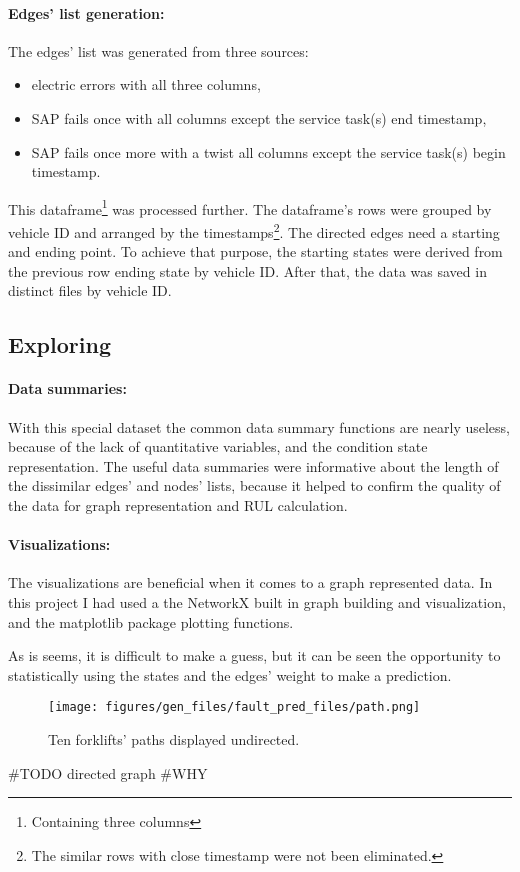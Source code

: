 \paragraph{Edges' list generation:}
The edges' list was generated from three sources: 
\begin{itemize}
	\item{electric errors} with all three columns,
	\item{SAP fails once} with all columns except the service task(s) end timestamp,
	\item{SAP fails once more with a twist} all columns except the service task(s) begin timestamp.
\end{itemize}

This dataframe\footnote{Containing three columns} was processed further. The dataframe's rows were grouped by vehicle ID and arranged by the timestamps\footnote{The similar rows with close timestamp were not been eliminated.}.
The directed edges need a starting and ending point. To achieve that purpose, the starting states were derived from the previous row ending state by vehicle ID. After that, the data was saved in distinct files by vehicle ID.
	\subsection{Exploring}
		\paragraph{Data summaries:}
		With this special dataset the common data summary functions are nearly useless, because of the lack of quantitative variables, and the condition state representation.
		The useful data summaries were informative about the length of the dissimilar edges' and nodes' lists, because it helped to confirm the quality of the data for graph representation and RUL calculation. 

		\paragraph{Visualizations:}
		The visualizations are beneficial when it comes to a graph represented data. In this project I had used a the NetworkX built in graph building and visualization, and the matplotlib package plotting functions.

		As is seems, it is difficult to make a guess, but it can be seen the opportunity to statistically using the states and the edges' weight to make a prediction.
			\begin{figure}[H]
			\centering
			\texttt{[image: figures/gen\_files/fault\_pred\_files/path.png]}
			\caption{Ten forklifts' paths displayed undirected.} 
			\end{figure}
		\#TODO directed graph
\#WHY

